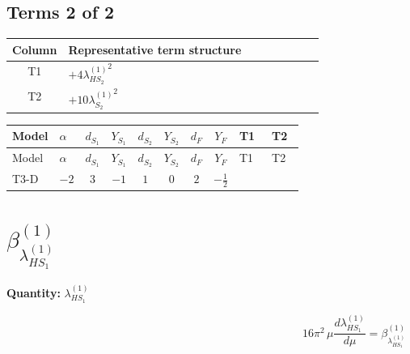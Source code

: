 \documentclass[8pt]{article}
\begin{document}
\begin{landscape}
\subsection*{Terms 2 of 2}
\begin{center}
\begin{tabular}{@{}c >{\raggedright\arraybackslash}p{0.82\linewidth}@{}}
\toprule
Column & Representative term structure \\
\midrule
T1 & \(\displaystyle +4 {\lambda_{HS_2}^{(1)}}^2\) \\
\midrule
T2 & \(\displaystyle +10 {\lambda_{S_2}^{(1)}}^2\) \\
\midrule
\bottomrule
\end{tabular}
\end{center}
\smallskip
\tiny
\begin{longtable}{@{}llcccccc >{\raggedright\arraybackslash}p{0.21\linewidth} >{\raggedright\arraybackslash}p{0.21\linewidth}@{}}
\toprule
Model & $\alpha$ & $d_{S_1}$ & $Y_{S_1}$ & $d_{S_2}$ & $Y_{S_2}$ & $d_F$ & $Y_F$ & T1 & T2 \\
\midrule
\endfirsthead
\toprule
Model & $\alpha$ & $d_{S_1}$ & $Y_{S_1}$ & $d_{S_2}$ & $Y_{S_2}$ & $d_F$ & $Y_F$ & T1 & T2 \\
\midrule
\endhead
T3-D & $-2$ & $3$ & $-1$ & $1$ & $0$ & $2$ & $-\frac{1}{2}$ & \scriptsize\adjustbox{max width=\linewidth}{$\begin{gathered} +4 {\lambda_{HS_2}^{(1)}}^2\end{gathered}$} & \scriptsize\adjustbox{max width=\linewidth}{$\begin{gathered} +10 {\lambda_{S_2}^{(1)}}^2\end{gathered}$} \\
\midrule
\bottomrule
\end{longtable}
\clearpage
\section*{$\beta_{\lambda_{HS_1}^{(1)}}^{(1)}$}
\noindent\textbf{Quantity: }$\lambda_{HS_1}^{(1)}$\par\smallskip
\[16\pi^2\,\mu\frac{d \lambda_{HS_1}^{(1)}}{d\mu}=\beta_{\lambda_{HS_1}^{(1)}}^{(1)}\]

\end{landscape}
\end{document}
